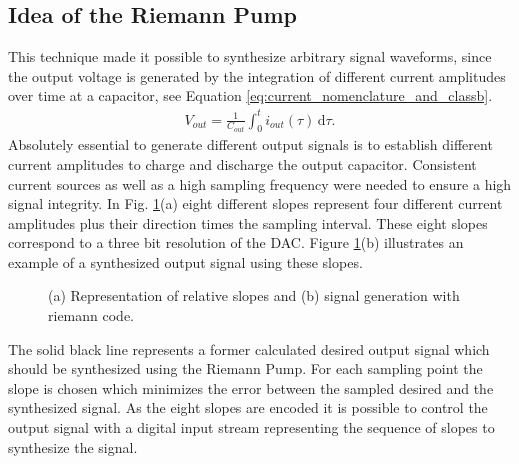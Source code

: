 \documentclass[journal]{IEEEtran}
\begin{document}
\subsection{Idea of the Riemann Pump}
This technique made it possible to synthesize arbitrary signal waveforms, since the output voltage is generated by the integration of different current amplitudes over time at a capacitor, see Equation \ref{eq:current_nomenclature_and_classb}.
%
\begin{align}
  V_{out} =  \frac{1}{C_{out}} \int_0^t \! i_{out}(\tau) \, \mathrm{d}\tau.
    \label{eq:current_nomenclature_and_classb}
\end{align}
%
Absolutely essential to generate different output signals is to establish different current amplitudes to charge and discharge the output capacitor.
Consistent current sources as well as a high sampling frequency were needed to ensure a high signal integrity.
In Fig. \ref{fig:SlopeSynthSignal}(a) eight different slopes represent four different current amplitudes plus their direction times the sampling interval.
These eight slopes correspond to a three bit resolution of the DAC. 
Figure \ref{fig:SlopeSynthSignal}(b) illustrates an example of a synthesized output signal using these slopes.
%
\begin{figure}[htb]
  \centering
	\begin{scriptsize}
  	\def\svgwidth{\columnwidth}
 	 
  	\caption{(a) Representation of relative slopes and (b) signal generation with riemann code.}
  	\label{fig:SlopeSynthSignal}
	\end{scriptsize}
\end{figure}
%
The solid black line represents a former calculated desired output signal which should be synthesized using the Riemann Pump.
For each sampling point the slope is chosen which minimizes the error between the sampled desired and the synthesized signal.
As the eight slopes are encoded it is possible to control the output signal with a digital input stream representing the sequence of slopes to synthesize the signal.
\end{document}
